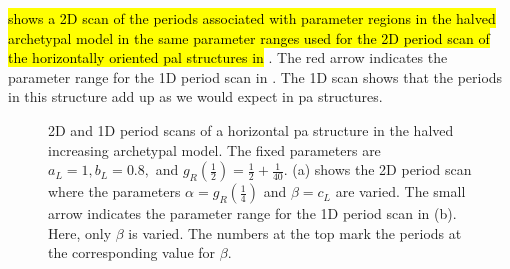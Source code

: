  \hl{shows a 2D scan of the periods associated with parameter regions in the halved archetypal model in the same parameter ranges used for the 2D period scan of the horizontally oriented \gls{pal} structures in} .
The red arrow indicates the parameter range for the 1D period scan in .
The 1D scan shows that the periods in this structure add up as we would expect in \gls{pa} structures.

\begin{figure}
	\centering
	\caption[2D and 1D period scans of a horizontal period-adding structure in the halved increasing archetypal model]{
		2D and 1D period scans of a horizontal \gls{pa} structure in the halved increasing archetypal model.
		The fixed parameters are $a_L = 1, b_L = 0.8,$ and $g_R\left(\frac{1}{2}\right) = \frac{1}{2} + \frac{1}{40}$.
		(a) shows the 2D period scan where the parameters $\alpha = g_R\left(\frac{1}{4}\right)$ and $\beta = c_L$ are varied.
		The small arrow indicates the parameter range for the 1D period scan in (b).
		Here, only $\beta$ is varied.
		The numbers at the top mark the periods at the corresponding value for $\beta$.
	}
	\label{fig:add.add.halved.hor}
\end{figure}


